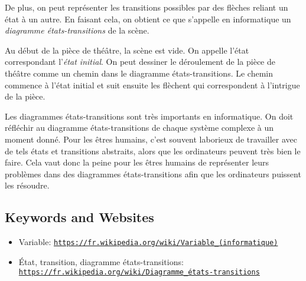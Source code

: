 \documentclass[a4paper,11pt]{report}
\newcommand{\BrochureUrlText}[1]{\texttt{#1}}
\begin{document}
De plus, on peut représenter les transitions possibles par des flèches reliant un état à un autre. En faisant cela, on obtient ce que s’appelle en informatique un \emph{diagramme états-transitions} de la scène.

Au début de la pièce de théâtre, la scène est vide. On appelle l’état correspondant l’\emph{état initial}. On peut dessiner le déroulement de la pièce de théâtre comme un chemin dans le diagramme états-transitions. Le chemin commence à l’état initial et suit ensuite les flèchent qui correspondent à l’intrigue de la pièce.

Les diagrammes états-transitions sont très importants en informatique. On doit réfléchir au diagramme états-transitions de chaque système complexe à un moment donné. Pour les êtres humains, c’est souvent laborieux de travailler avec de tels états et transitions abstraits, alors que les ordinateurs peuvent très bien le faire. Cela vaut donc la peine pour les êtres humains de représenter leurs problèmes dans des diagrammes états-transitions afin que les ordinateurs puissent les résoudre.

{\raggedright

\subsection*{Keywords and Websites}

\begin{itemize}
  \item Variable: \href{https://fr.wikipedia.org/wiki/Variable_(informatique)}{\BrochureUrlText{https://fr.wikipedia.org/wiki/Variable\_(informatique)}}
  \item État, transition, diagramme états-transitions: \href{https://fr.wikipedia.org/wiki/Diagramme_\%C3\%A9tats-transitions}{\BrochureUrlText{https://fr.wikipedia.org/wiki/Diagramme\_états-transitions}}
\end{itemize}


}
\end{document}
